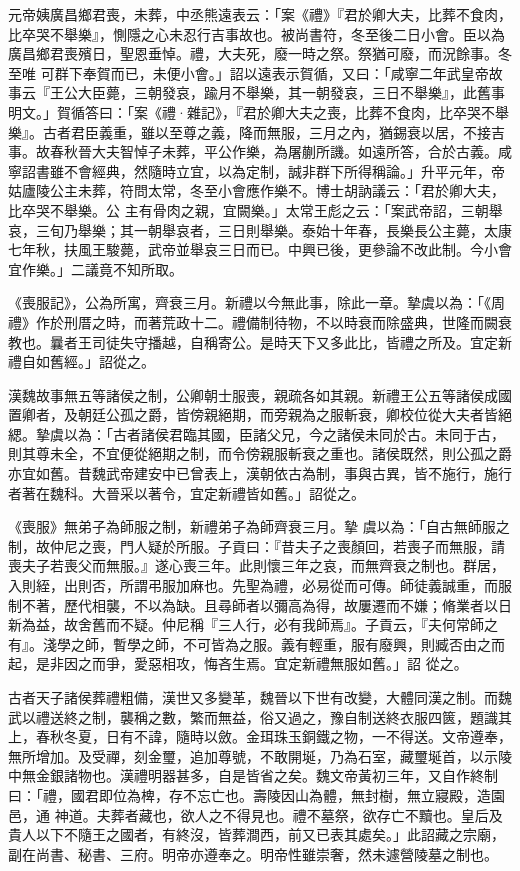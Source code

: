 \begin{pinyinscope}
 元帝姨廣昌鄉君喪，未葬，中丞熊遠表云：「案《禮》『君於卿大夫，比葬不食肉，比卒哭不舉樂』，惻隱之心未忍行吉事故也。被尚書符，冬至後二日小會。臣以為廣昌鄉君喪殯日，聖恩垂悼。禮，大夫死，廢一時之祭。祭猶可廢，而況餘事。冬至唯
 可群下奉賀而已，未便小會。」詔以遠表示賀循，又曰：「咸寧二年武皇帝故事云『王公大臣薨，三朝發哀，踰月不舉樂，其一朝發哀，三日不舉樂』，此舊事明文。」賀循答曰：「案《禮·雜記》，『君於卿大夫之喪，比葬不食肉，比卒哭不舉樂』。古者君臣義重，雖以至尊之義，降而無服，三月之內，猶錫衰以居，不接吉事。故春秋晉大夫智悼子未葬，平公作樂，為屠蒯所譏。如遠所答，合於古義。咸寧詔書雖不會經典，然隨時立宜，以為定制，誠非群下所得稱論。」升平元年，帝姑廬陵公主未葬，符問太常，冬至小會應作樂不。博士胡訥議云：「君於卿大夫，比卒哭不舉樂。公
 主有骨肉之親，宜闕樂。」太常王彪之云：「案武帝詔，三朝舉哀，三旬乃舉樂；其一朝舉哀者，三日則舉樂。泰始十年春，長樂長公主薨，太康七年秋，扶風王駿薨，武帝並舉哀三日而已。中興已後，更參論不改此制。今小會宜作樂。」二議竟不知所取。



 《喪服記》，公為所寓，齊衰三月。新禮以今無此事，除此一章。摯虞以為：「《周禮》作於刑厝之時，而著荒政十二。禮備制待物，不以時衰而除盛典，世隆而闕衰教也。曩者王司徒失守播越，自稱寄公。是時天下又多此比，皆禮之所及。宜定新禮自如舊經。」詔從之。



 漢魏故事無五等諸侯之制，公卿朝士服喪，親疏各如其親。新禮王公五等諸侯成國置卿者，及朝廷公孤之爵，皆傍親絕期，而旁親為之服斬衰，卿校位從大夫者皆絕緦。摯虞以為：「古者諸侯君臨其國，臣諸父兄，今之諸侯未同於古。未同于古，則其尊未全，不宜便從絕期之制，而令傍親服斬衰之重也。諸侯既然，則公孤之爵亦宜如舊。昔魏武帝建安中已曾表上，漢朝依古為制，事與古異，皆不施行，施行者著在魏科。大晉采以著令，宜定新禮皆如舊。」詔從之。



 《喪服》無弟子為師服之制，新禮弟子為師齊衰三月。摯
 虞以為：「自古無師服之制，故仲尼之喪，門人疑於所服。子貢曰：『昔夫子之喪顏回，若喪子而無服，請喪夫子若喪父而無服。』遂心喪三年。此則懷三年之哀，而無齊衰之制也。群居，入則絰，出則否，所謂弔服加麻也。先聖為禮，必易從而可傳。師徒義誠重，而服制不著，歷代相襲，不以為缺。且尋師者以彌高為得，故屢遷而不嫌；脩業者以日新為益，故舍舊而不疑。仲尼稱『三人行，必有我師焉』。子貢云，『夫何常師之有』。淺學之師，暫學之師，不可皆為之服。義有輕重，服有廢興，則臧否由之而起，是非因之而爭，愛惡相攻，悔吝生焉。宜定新禮無服如舊。」詔
 從之。



 古者天子諸侯葬禮粗備，漢世又多變革，魏晉以下世有改變，大體同漢之制。而魏武以禮送終之制，襲稱之數，繁而無益，俗又過之，豫自制送終衣服四篋，題識其上，春秋冬夏，日有不諱，隨時以斂。金珥珠玉銅鐵之物，一不得送。文帝遵奉，無所增加。及受禪，刻金璽，追加尊號，不敢開埏，乃為石室，藏璽埏首，以示陵中無金銀諸物也。漢禮明器甚多，自是皆省之矣。魏文帝黃初三年，又自作終制曰：「禮，國君即位為椑，存不忘亡也。壽陵因山為體，無封樹，無立寢殿，造園邑，通
 神道。夫葬者藏也，欲人之不得見也。禮不墓祭，欲存亡不黷也。皇后及貴人以下不隨王之國者，有終沒，皆葬澗西，前又已表其處矣。」此詔藏之宗廟，副在尚書、秘書、三府。明帝亦遵奉之。明帝性雖崇奢，然未遽營陵墓之制也。




\end{pinyinscope}
